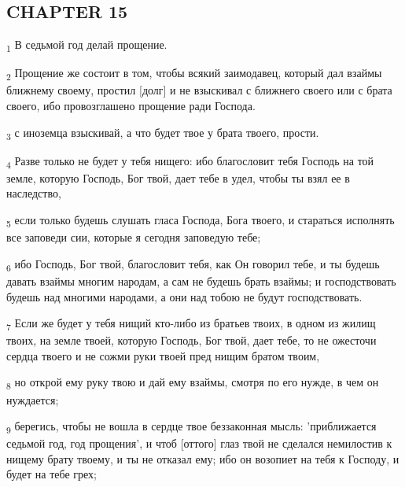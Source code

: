 \subsection{CHAPTER 15}
\begin{tcolorbox}
\textsubscript{1} В седьмой год делай прощение.
\end{tcolorbox}
\begin{tcolorbox}
\textsubscript{2} Прощение же состоит в том, чтобы всякий заимодавец, который дал взаймы ближнему своему, простил [долг] и не взыскивал с ближнего своего или с брата своего, ибо провозглашено прощение ради Господа.
\end{tcolorbox}
\begin{tcolorbox}
\textsubscript{3} с иноземца взыскивай, а что будет твое у брата твоего, прости.
\end{tcolorbox}
\begin{tcolorbox}
\textsubscript{4} Разве только не будет у тебя нищего: ибо благословит тебя Господь на той земле, которую Господь, Бог твой, дает тебе в удел, чтобы ты взял ее в наследство,
\end{tcolorbox}
\begin{tcolorbox}
\textsubscript{5} если только будешь слушать гласа Господа, Бога твоего, и стараться исполнять все заповеди сии, которые я сегодня заповедую тебе;
\end{tcolorbox}
\begin{tcolorbox}
\textsubscript{6} ибо Господь, Бог твой, благословит тебя, как Он говорил тебе, и ты будешь давать взаймы многим народам, а сам не будешь брать взаймы; и господствовать будешь над многими народами, а они над тобою не будут господствовать.
\end{tcolorbox}
\begin{tcolorbox}
\textsubscript{7} Если же будет у тебя нищий кто-либо из братьев твоих, в одном из жилищ твоих, на земле твоей, которую Господь, Бог твой, дает тебе, то не ожесточи сердца твоего и не сожми руки твоей пред нищим братом твоим,
\end{tcolorbox}
\begin{tcolorbox}
\textsubscript{8} но открой ему руку твою и дай ему взаймы, смотря по его нужде, в чем он нуждается;
\end{tcolorbox}
\begin{tcolorbox}
\textsubscript{9} берегись, чтобы не вошла в сердце твое беззаконная мысль: 'приближается седьмой год, год прощения', и чтоб [оттого] глаз твой не сделался немилостив к нищему брату твоему, и ты не отказал ему; ибо он возопиет на тебя к Господу, и будет на тебе грех;
\end{tcolorbox}
